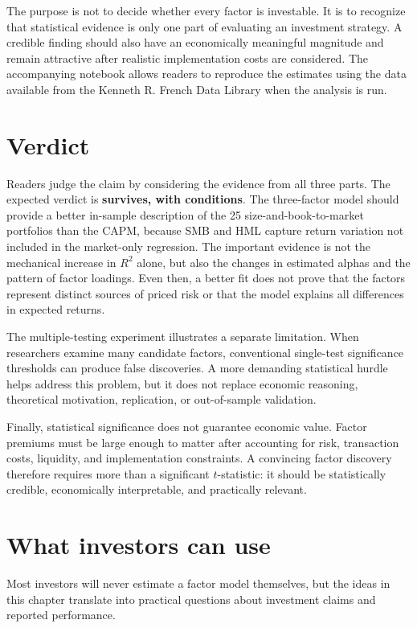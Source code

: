 The purpose is not to decide whether every factor is investable. It is to recognize that statistical evidence is only one part of evaluating an investment strategy. A credible finding should also have an economically meaningful magnitude and remain attractive after realistic implementation costs are considered. The accompanying notebook allows readers to reproduce the estimates using the data available from the Kenneth R. French Data Library when the analysis is run.

\section{Verdict}
\label{sec:03-verdict}

Readers judge the claim by considering the evidence from all three parts. The expected verdict is \textbf{survives, with conditions}. The three-factor model should provide a better in-sample description of the 25 size-and-book-to-market portfolios than the CAPM, because SMB and HML capture return variation not included in the market-only regression. The important evidence is not the mechanical increase in $R^2$ alone, but also the changes in estimated alphas and the pattern of factor loadings. Even then, a better fit does not prove that the factors represent distinct sources of priced risk or that the model explains all differences in expected returns.

The multiple-testing experiment illustrates a separate limitation. When researchers examine many candidate factors, conventional single-test significance thresholds can produce false discoveries. A more demanding statistical hurdle helps address this problem, but it does not replace economic reasoning, theoretical motivation, replication, or out-of-sample validation.

Finally, statistical significance does not guarantee economic value. Factor premiums must be large enough to matter after accounting for risk, transaction costs, liquidity, and implementation constraints. A convincing factor discovery therefore requires more than a significant $t$-statistic: it should be statistically credible, economically interpretable, and practically relevant.

\section{What investors can use}
\label{sec:03-investors}

Most investors will never estimate a factor model themselves, but the ideas in this chapter translate into practical questions about investment claims and reported performance.

